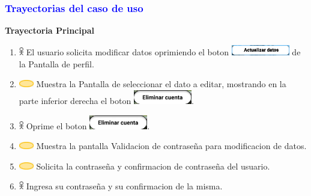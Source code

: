 \subsubsection{\textcolor{blue}{Trayectorias del caso de uso}}
\textbf{Trayectoria Principal}
    \begin{enumerate}
        \item \includegraphics[width=0.0150\textwidth]{Figuras/persona.png} El usuario solicita modificar datos oprimiendo el boton \includegraphics[width=0.2\textwidth]{ComponentesCU/AD.png}  de la Pantalla de perfil.
        \item \includegraphics[width=0.0500\textwidth]{Figuras/sistema.png} Muestra la Pantalla de seleccionar el dato a editar, mostrando en la parte inferior derecha el boton \includegraphics[width=0.2\textwidth]{ComponentesCU/img.png}.
        \item \includegraphics[width=0.0150\textwidth]{Figuras/persona.png} Oprime el boton \includegraphics[width=0.2\textwidth]{ComponentesCU/img.png}.
         \item \includegraphics[width=0.0500\textwidth]{Figuras/sistema.png} Muestra la pantalla Validacion de contraseña para modificacion de datos.
        \item \includegraphics[width=0.0500\textwidth]{Figuras/sistema.png} Solicita la contraseña y confirmacion de contraseña del usuario.
        \item \includegraphics[width=0.0150\textwidth]{Figuras/persona.png} Ingresa su contraseña y su confirmacion de la misma.

\end{enumerate}
